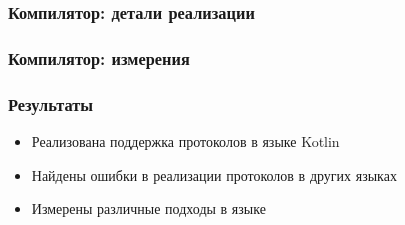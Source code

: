 \documentclass{beamer}
\begin{document}
\begin{frame}\frametitle{Компилятор: детали реализации}
\end{frame}

\begin{frame}\frametitle{Компилятор: измерения}
\end{frame}

\begin{frame}\frametitle{Результаты}
\begin{itemize}
    \item Реализована поддержка протоколов в языке Kotlin
    \item Найдены ошибки в реализации протоколов в других языках
    \item Измерены различные подходы в языке
\end{itemize}
\end{frame}
\end{document}
